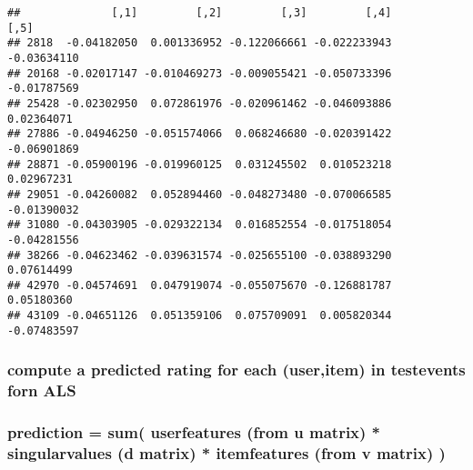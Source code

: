 \documentclass[]{article}
\newenvironment{Shaded}{\begin{snugshade}}{\end{snugshade}}
\newcommand{\CommentTok}[1]{\textcolor[rgb]{0.56,0.35,0.01}{\textit{#1}}}
\newcommand{\ControlFlowTok}[1]{\textcolor[rgb]{0.13,0.29,0.53}{\textbf{#1}}}
\newcommand{\DecValTok}[1]{\textcolor[rgb]{0.00,0.00,0.81}{#1}}
\newcommand{\KeywordTok}[1]{\textcolor[rgb]{0.13,0.29,0.53}{\textbf{#1}}}
\newcommand{\NormalTok}[1]{#1}
\newcommand{\OperatorTok}[1]{\textcolor[rgb]{0.81,0.36,0.00}{\textbf{#1}}}
\newcommand{\StringTok}[1]{\textcolor[rgb]{0.31,0.60,0.02}{#1}}
\begin{document}
\begin{verbatim}
##              [,1]         [,2]         [,3]         [,4]        [,5]
## 2818  -0.04182050  0.001336952 -0.122066661 -0.022233943 -0.03634110
## 20168 -0.02017147 -0.010469273 -0.009055421 -0.050733396 -0.01787569
## 25428 -0.02302950  0.072861976 -0.020961462 -0.046093886  0.02364071
## 27886 -0.04946250 -0.051574066  0.068246680 -0.020391422 -0.06901869
## 28871 -0.05900196 -0.019960125  0.031245502  0.010523218  0.02967231
## 29051 -0.04260082  0.052894460 -0.048273480 -0.070066585 -0.01390032
## 31080 -0.04303905 -0.029322134  0.016852554 -0.017518054 -0.04281556
## 38266 -0.04623462 -0.039631574 -0.025655100 -0.038893290  0.07614499
## 42970 -0.04574691  0.047919074 -0.055075670 -0.126881787  0.05180360
## 43109 -0.04651126  0.051359106  0.075709091  0.005820344 -0.07483597
\end{verbatim}

\hypertarget{compute-a-predicted-rating-for-each-useritem-in-testevents-forn-als}{%
\subsubsection{compute a predicted rating for each (user,item) in
testevents forn
ALS}\label{compute-a-predicted-rating-for-each-useritem-in-testevents-forn-als}}

\hypertarget{prediction-sum-userfeatures-from-u-matrix-singularvalues-d-matrix-itemfeatures-from-v-matrix}{%
\subsubsection{prediction = sum( userfeatures (from u matrix) *
singularvalues (d matrix) * itemfeatures (from v matrix)
)}\label{prediction-sum-userfeatures-from-u-matrix-singularvalues-d-matrix-itemfeatures-from-v-matrix}}

\begin{Shaded}
\end{Shaded}
\end{document}
